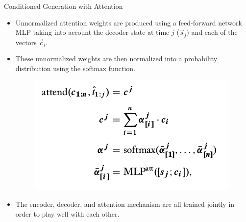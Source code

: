 \begin{frame}{Conditioned Generation with Attention}
\begin{scriptsize}
\begin{itemize}
\item Unnormalized attention weights  are produced using a feed-forward network MLP taking into account the decoder state at time $j$ ($\vec{s}_j$) and each of the vectors $\vec{c}_i$.
\item These unnormalized weights are then normalized into a probability distribution using the softmax function.

\begin{figure}[h]
        	\includegraphics[scale = 0.35]{pics/atten_formula.png}
        \end{figure}  

        
                

\item The encoder, decoder, and attention mechanism are all trained jointly in order to play well with each other.


\end{itemize}
\end{scriptsize}
\end{frame}







